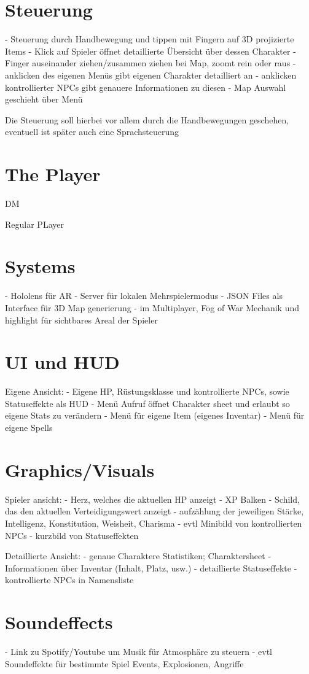 \documentclass[11pt]{article}
\begin{document}
    \section{Steuerung}\label{sec:chapter_controls}
    - Steuerung durch Handbewegung und tippen mit Fingern auf 3D projizierte Items
    - Klick auf Spieler öffnet detaillierte Übersicht über dessen Charakter
    - Finger auseinander ziehen/zusammen ziehen bei Map, zoomt rein oder raus
    - anklicken des eigenen Menüs gibt eigenen Charakter detailliert an
    - anklicken kontrollierter NPCs gibt genauere Informationen zu diesen
    - Map Auswahl geschieht über Menü

    Die Steuerung soll hierbei vor allem durch die Handbewegungen geschehen, eventuell ist später auch eine
    Sprachsteuerung

    \section{The Player}
    DM


    Regular PLayer


    \section{Systems}
    - Hololens für AR
    - Server für lokalen Mehrspielermodus
    - JSON Files als Interface für 3D Map generierung
    - im Multiplayer, Fog of War Mechanik und highlight für sichtbares Areal der Spieler

    \section{UI und HUD}
    Eigene Ansicht:
    - Eigene HP, Rüstungsklasse und kontrollierte NPCs, sowie Statuseffekte als HUD
    - Menü Aufruf öffnet Charakter sheet und erlaubt so eigene Stats zu verändern
    - Menü für eigene Item (eigenes Inventar)
    - Menü für eigene Spells

    \section{Graphics/Visuals}
    Spieler ansicht:
    - Herz, welches die aktuellen HP anzeigt
    - XP Balken
    - Schild, das den aktuellen Verteidigungswert anzeigt
    - aufzählung der jeweiligen Stärke, Intelligenz, Konstitution, Weisheit, Charisma
    - evtl Minibild von kontrollierten NPCs
    - kurzbild von Statuseffekten

    Detaillierte Ansicht:
    - genaue Charaktere Statistiken; Charaktersheet
    - Informationen über Inventar (Inhalt, Platz, usw.)
    - detaillierte Statuseffekte
    - kontrollierte NPCs in Namensliste

    \section{Soundeffects}
    - Link zu Spotify/Youtube um Musik für Atmosphäre zu steuern
    - evtl Soundeffekte für bestimmte Spiel Events, Explosionen, Angriffe
\end{document}
